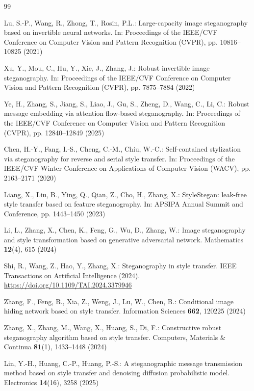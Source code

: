 \documentclass[runningheads]{llncs}
\providecommand{\doi}[1]{\href{https://doi.org/#1}{https://doi.org/#1}}
\begin{document}
\begin{thebibliography}{99}

Lu, S.-P., Wang, R., Zhong, T., Rosin, P.L.: Large-capacity image steganography based on invertible neural networks. In: Proceedings of the IEEE/CVF Conference on Computer Vision and Pattern Recognition (CVPR), pp. 10816--10825 (2021)

Xu, Y., Mou, C., Hu, Y., Xie, J., Zhang, J.: Robust invertible image steganography. In: Proceedings of the IEEE/CVF Conference on Computer Vision and Pattern Recognition (CVPR), pp. 7875--7884 (2022)

Ye, H., Zhang, S., Jiang, S., Liao, J., Gu, S., Zheng, D., Wang, C., Li, C.: Robust message embedding via attention flow-based steganography. In: Proceedings of the IEEE/CVF Conference on Computer Vision and Pattern Recognition (CVPR), pp. 12840--12849 (2025)

Chen, H.-Y., Fang, I.-S., Cheng, C.-M., Chiu, W.-C.: Self-contained stylization via steganography for reverse and serial style transfer. In: Proceedings of the IEEE/CVF Winter Conference on Applications of Computer Vision (WACV), pp. 2163--2171 (2020)

Liang, X., Liu, B., Ying, Q., Qian, Z., Cho, H., Zhang, X.: StyleStegan: leak-free style transfer based on feature steganography. In: APSIPA Annual Summit and Conference, pp. 1443--1450 (2023)

Li, L., Zhang, X., Chen, K., Feng, G., Wu, D., Zhang, W.: Image steganography and style transformation based on generative adversarial network. Mathematics \textbf{12}(4), 615 (2024)

Shi, R., Wang, Z., Hao, Y., Zhang, X.: Steganography in style transfer. IEEE Transactions on Artificial Intelligence (2024). \doi{10.1109/TAI.2024.3379946}

Zhang, F., Feng, B., Xia, Z., Weng, J., Lu, W., Chen, B.: Conditional image hiding network based on style transfer. Information Sciences \textbf{662}, 120225 (2024)

Zhang, X., Zhang, M., Wang, X., Huang, S., Di, F.: Constructive robust steganography algorithm based on style transfer. Computers, Materials \& Continua \textbf{81}(1), 1433--1448 (2024)

Lin, Y.-H., Huang, C.-P., Huang, P.-S.: A steganographic message transmission method based on style transfer and denoising diffusion probabilistic model. Electronics \textbf{14}(16), 3258 (2025)


\end{thebibliography}
\end{document}
